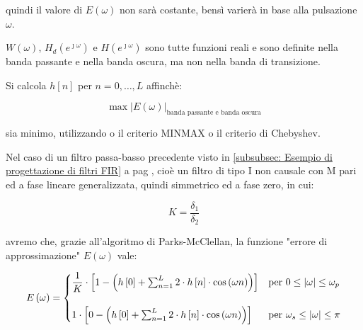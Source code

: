 quindi il valore di $E \left(\omega\right)$ non sarà costante, bensì varierà in base alla pulsazione $\omega$. \newline 

$W \left(\omega\right)$, $H_d \left(e^{\jmath \omega}\right)$ e $H \left(e^{\jmath \omega}\right)$ sono tutte funzioni reali e sono definite nella banda passante e nella banda oscura, 
ma non nella banda di transizione. \newline 

Si calcola $h \left[ n\right]$ per $n = 0, \dots, L$ affinchè: 

{
    \Large 
    \begin{equation}
        \max{\left| E \left(\omega\right) \right|_{\text{banda passante e banda oscura}}} 
    \end{equation}
}

sia minimo, utilizzando o il criterio MINMAX o il criterio di Chebyshev. \newline 

Nel caso di un filtro passa-basso precedente visto in \ref{subsubsec: Esempio di progettazione di filtri FIR}  a pag \pageref{subsubsec: Esempio di progettazione di filtri FIR}, 
cioè un filtro di tipo I non causale con M pari ed a fase lineare generalizzata, quindi simmetrico ed a fase zero, in cui: 

{
    \Large 
    \begin{equation}
        K = \dfrac{\delta_1}{\delta_2}
    \end{equation}
} 

avremo che, grazie all'algoritmo di Parks-McClellan, la funzione "errore di approssimazione" $E \left(\omega\right)$ vale: 

{
    \Large 
    \begin{equation}
        E \left(\omega\right) 
        =
        \begin{cases}
        \setlength{\jot}{10pt} %
        \dfrac{1}{K} 
        \cdot 
        \left[
            1 
            - 
            \left(
                h \left[ 0\right] 
                + 
                \sum_{n = 1}^{L} 
                2 \cdot h \left[ n\right] \cdot \cos \left(\omega n\right)
            \right)
        \right] 
        &\text{per } 0 \leq \abs{\omega} \leq \omega_p
        \\
        \quad
        \\
        1 
        \cdot 
        \left[
            0 
            - 
            \left(
                h \left[ 0\right] 
                + 
                \sum_{n = 1}^{L} 
                2 \cdot h \left[ n\right] \cdot \cos \left(\omega n\right)
            \right)
        \right] 
         &\text{per } \omega_s \leq \abs{\omega} \leq \pi
        \end{cases}
    \end{equation}
} 

